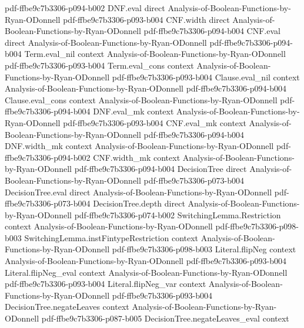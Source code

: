 \begin{theorem}
  {pdf-ffbe9c7b3306-p094-b002}
\proofstep
  {DNF.eval}
  {direct}
  {Analysis-of-Boolean-Functions-by-Ryan-ODonnell}
  {pdf-ffbe9c7b3306-p093-b004}
\proofstep
  {CNF.width}
  {direct}
  {Analysis-of-Boolean-Functions-by-Ryan-ODonnell}
  {pdf-ffbe9c7b3306-p094-b004}
\proofstep
  {CNF.eval}
  {direct}
  {Analysis-of-Boolean-Functions-by-Ryan-ODonnell}
  {pdf-ffbe9c7b3306-p094-b004}
\proofstep
  {Term.eval_nil}
  {context}
  {Analysis-of-Boolean-Functions-by-Ryan-ODonnell}
  {pdf-ffbe9c7b3306-p093-b004}
\proofstep
  {Term.eval_cons}
  {context}
  {Analysis-of-Boolean-Functions-by-Ryan-ODonnell}
  {pdf-ffbe9c7b3306-p093-b004}
\proofstep
  {Clause.eval_nil}
  {context}
  {Analysis-of-Boolean-Functions-by-Ryan-ODonnell}
  {pdf-ffbe9c7b3306-p094-b004}
\proofstep
  {Clause.eval_cons}
  {context}
  {Analysis-of-Boolean-Functions-by-Ryan-ODonnell}
  {pdf-ffbe9c7b3306-p094-b004}
\proofstep
  {DNF.eval_mk}
  {context}
  {Analysis-of-Boolean-Functions-by-Ryan-ODonnell}
  {pdf-ffbe9c7b3306-p093-b004}
\proofstep
  {CNF.eval_mk}
  {context}
  {Analysis-of-Boolean-Functions-by-Ryan-ODonnell}
  {pdf-ffbe9c7b3306-p094-b004}
\proofstep
  {DNF.width_mk}
  {context}
  {Analysis-of-Boolean-Functions-by-Ryan-ODonnell}
  {pdf-ffbe9c7b3306-p094-b002}
\proofstep
  {CNF.width_mk}
  {context}
  {Analysis-of-Boolean-Functions-by-Ryan-ODonnell}
  {pdf-ffbe9c7b3306-p094-b004}
\proofstep
  {DecisionTree}
  {direct}
  {Analysis-of-Boolean-Functions-by-Ryan-ODonnell}
  {pdf-ffbe9c7b3306-p073-b004}
\proofstep
  {DecisionTree.eval}
  {direct}
  {Analysis-of-Boolean-Functions-by-Ryan-ODonnell}
  {pdf-ffbe9c7b3306-p073-b004}
\proofstep
  {DecisionTree.depth}
  {direct}
  {Analysis-of-Boolean-Functions-by-Ryan-ODonnell}
  {pdf-ffbe9c7b3306-p074-b002}
\proofstep
  {SwitchingLemma.Restriction}
  {context}
  {Analysis-of-Boolean-Functions-by-Ryan-ODonnell}
  {pdf-ffbe9c7b3306-p098-b003}
\proofstep
  {SwitchingLemma.instFintypeRestriction}
  {context}
  {Analysis-of-Boolean-Functions-by-Ryan-ODonnell}
  {pdf-ffbe9c7b3306-p098-b003}
\proofstep
  {Literal.flipNeg}
  {context}
  {Analysis-of-Boolean-Functions-by-Ryan-ODonnell}
  {pdf-ffbe9c7b3306-p093-b004}
\proofstep
  {Literal.flipNeg_eval}
  {context}
  {Analysis-of-Boolean-Functions-by-Ryan-ODonnell}
  {pdf-ffbe9c7b3306-p093-b004}
\proofstep
  {Literal.flipNeg_var}
  {context}
  {Analysis-of-Boolean-Functions-by-Ryan-ODonnell}
  {pdf-ffbe9c7b3306-p093-b004}
\proofstep
  {DecisionTree.negateLeaves}
  {context}
  {Analysis-of-Boolean-Functions-by-Ryan-ODonnell}
  {pdf-ffbe9c7b3306-p087-b005}
\proofstep
  {DecisionTree.negateLeaves_eval}
  {context}

\end{theorem}
